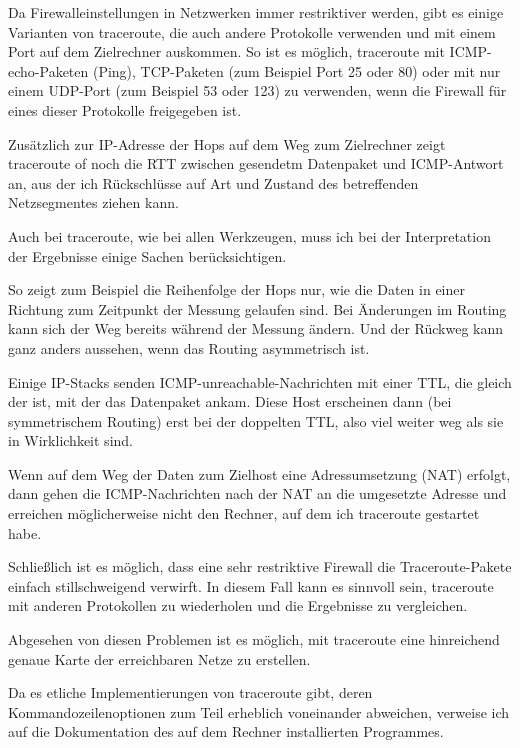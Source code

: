 \begin{normaltext}
  Da Firewalleinstellungen in Netzwerken immer restriktiver werden, gibt es
  einige Varianten von traceroute, die auch andere Protokolle verwenden und
  mit einem Port auf dem Zielrechner auskommen. So ist es möglich, traceroute
  mit ICMP-echo-Paketen (Ping), TCP-Paketen (zum Beispiel Port 25 oder 80)
  oder mit nur einem UDP-Port (zum Beispiel 53 oder 123) zu verwenden, wenn
  die Firewall für eines dieser Protokolle freigegeben ist.

  Zusätzlich zur IP-Adresse der Hops auf dem Weg zum Zielrechner zeigt
  traceroute of noch die RTT zwischen gesendetm Datenpaket und ICMP-Antwort
  an, aus der ich Rückschlüsse auf Art und Zustand des betreffenden
  Netzsegmentes ziehen kann.

  Auch bei traceroute, wie bei allen Werkzeugen, muss ich bei der
  Interpretation der Ergebnisse einige Sachen berücksichtigen.

  So zeigt zum Beispiel die Reihenfolge der Hops nur, wie die Daten in einer
  Richtung zum Zeitpunkt der Messung gelaufen sind. Bei Änderungen im Routing
  kann sich der Weg bereits während der Messung ändern. Und der Rückweg kann
  ganz anders aussehen, wenn das Routing asymmetrisch ist.

  Einige IP-Stacks senden ICMP-unreachable-Nachrichten mit einer TTL, die
  gleich der ist, mit der das Datenpaket ankam. Diese Host erscheinen dann
  (bei symmetrischem Routing) erst bei der doppelten TTL, also viel weiter weg
  als sie in Wirklichkeit sind.

  Wenn auf dem Weg der Daten zum Zielhost eine Adressumsetzung (NAT) erfolgt,
  dann gehen die ICMP-Nachrichten nach der NAT an die umgesetzte Adresse und
  erreichen möglicherweise nicht den Rechner, auf dem ich traceroute gestartet
  habe.

  Schließlich ist es möglich, dass eine sehr restriktive Firewall die
  Traceroute-Pakete einfach stillschweigend verwirft. In diesem Fall kann es
  sinnvoll sein, traceroute mit anderen Protokollen zu wiederholen und die
  Ergebnisse zu vergleichen.

  Abgesehen von diesen Problemen ist es möglich, mit traceroute eine
  hinreichend genaue Karte der erreichbaren Netze zu erstellen.

  Da es etliche Implementierungen von traceroute gibt, deren
  Kommandozeilenoptionen zum Teil erheblich voneinander abweichen, verweise
  ich auf die Dokumentation des auf dem Rechner installierten Programmes.
\end{normaltext}

